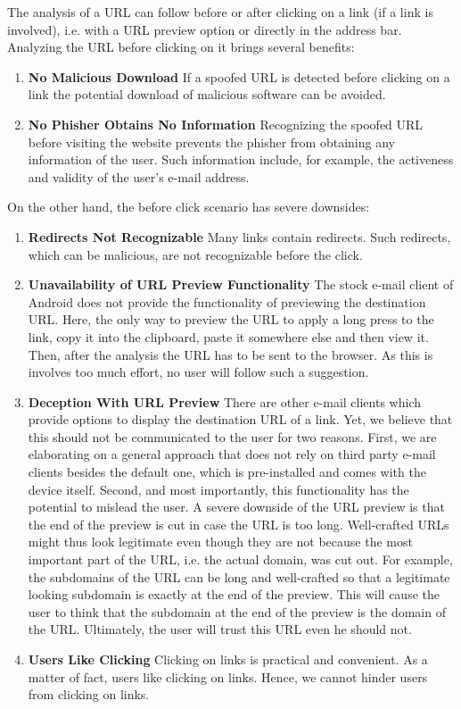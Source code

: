\begin{description}[leftmargin=0cm]
	\item[After Click URL Analysis] The analysis of a URL can follow before or after clicking on a link (if a link is involved), i.e. with a URL preview option or directly in the address bar. 
Analyzing the URL before clicking on it brings several benefits:

\begin{enumerate}
	\item \textbf{No Malicious Download} If a spoofed URL is detected before clicking on a link the potential download of  malicious software can be avoided. 
	\item \textbf{No Phisher Obtains No Information} Recognizing the spoofed URL before visiting the website prevents the phisher from obtaining any information of the user. Such information include, for example, the activeness and validity of the user's e-mail address. 
\end{enumerate}

On the other hand, the before click scenario has severe downsides:

\begin{enumerate}
	\item \textbf{Redirects Not Recognizable} Many links contain redirects. Such redirects, which can be malicious, are not recognizable before the click.
	\item \textbf{Unavailability of URL Preview Functionality} The stock e-mail client of Android does not provide the functionality of previewing the destination URL. 
Here, the only way to preview the URL to apply a long press to the link, copy it into the clipboard, paste it somewhere else and then view it. 
Then, after the analysis the URL has to be sent to the browser.
As this is involves too much effort, no user will follow such a suggestion.
	\item \textbf{Deception With URL Preview} There are other e-mail clients which provide options to display the destination URL of a link.
Yet, we believe that this should not be communicated to the user for two reasons.
First, we are elaborating on a general approach that does not rely on third party e-mail clients besides the default one, which is pre-installed and comes with the device itself.
Second, and most importantly, this functionality has the potential to mislead the user.
A severe downside of the URL preview is that the end of the preview is cut in case the URL is too long.
 Well-crafted URLs might thus look legitimate even though they are not because the most important part of the URL, i.e. the actual domain, was cut out.
 For example, the subdomains of the URL can be long and well-crafted so that a legitimate looking subdomain is exactly at the end of the preview.
 This will cause the user to think that the subdomain at the end of the preview is the domain of the URL.
 Ultimately, the user will trust this URL even he should not.
	\item \textbf{Users Like Clicking} Clicking on links is practical and convenient. As a matter of fact, users like clicking on links. Hence, we cannot hinder users from clicking on links.
\end{enumerate}


\end{description}
